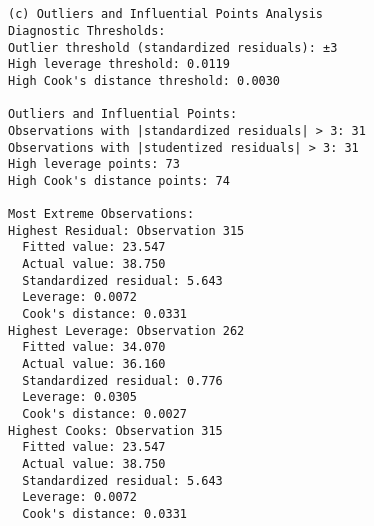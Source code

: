 \documentclass[8pt, twocolumn]{extarticle}
\begin{document}
    \begin{center}
    \end{center}
    { \hspace*{\fill} \\}
    
    \begin{Verbatim}[commandchars=\\\{\}]

(c) Outliers and Influential Points Analysis
Diagnostic Thresholds:
Outlier threshold (standardized residuals): ±3
High leverage threshold: 0.0119
High Cook's distance threshold: 0.0030

Outliers and Influential Points:
Observations with |standardized residuals| > 3: 31
Observations with |studentized residuals| > 3: 31
High leverage points: 73
High Cook's distance points: 74

Most Extreme Observations:
Highest Residual: Observation 315
  Fitted value: 23.547
  Actual value: 38.750
  Standardized residual: 5.643
  Leverage: 0.0072
  Cook's distance: 0.0331
Highest Leverage: Observation 262
  Fitted value: 34.070
  Actual value: 36.160
  Standardized residual: 0.776
  Leverage: 0.0305
  Cook's distance: 0.0027
Highest Cooks: Observation 315
  Fitted value: 23.547
  Actual value: 38.750
  Standardized residual: 5.643
  Leverage: 0.0072
  Cook's distance: 0.0331
    \end{Verbatim}

    \begin{center}
    \end{center}
    { \hspace*{\fill} \\}
    
\end{document}
